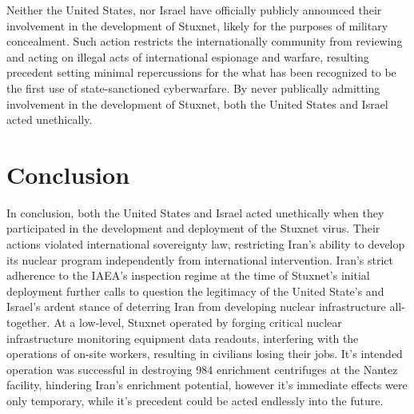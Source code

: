 \documentclass[12pt]{article}
\begin{document}
\begin{multicols}{2}
Neither the United States, nor Israel have officially publicly announced their involvement in the development of Stuxnet, likely for the purposes of military concealment. Such action restricts the internationally community from reviewing and acting on illegal acts of international espionage and warfare, resulting precedent setting minimal repercussions for the what has been recognized to be the first use of state-sanctioned cyberwarfare. By never publically admitting involvement in the development of Stuxnet, both the United States and Israel acted unethically.



\section{Conclusion}

In conclusion, both the United States and Israel acted unethically when they participated in the development and deployment of the Stuxnet virus. Their actions violated international sovereignty law, restricting Iran's ability to develop its nuclear program independently from international intervention. Iran's strict adherence to the IAEA's inspection regime at the time of Stuxnet's initial deployment further calls to question the legitimacy of the United State's and Israel's ardent stance of deterring Iran from developing nuclear infrastructure all-together. At a low-level, Stuxnet operated by forging critical nuclear infrastructure monitoring equipment data readouts, interfering with the operations of on-site workers, resulting in civilians losing their jobs. It's intended operation was successful in destroying 984 enrichment centrifuges at the Nantez facility, hindering Iran's enrichment potential, however it's immediate effects were only temporary, while it's precedent could be acted endlessly into the future.
 

\end{multicols}

\nocite{*}



\newpage

\end{document}
